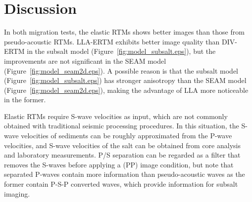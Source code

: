 \documentclass[manuscript,ulem,graphix,revised]{geophysics}
\begin{document}
%

\section{Discussion}
\indent\indent
In both migration tests, the elastic RTMs shows better images than those from pseudo-acoustic RTMs. LLA-ERTM exhibits better image quality than DIV-ERTM in the subsalt model (Figure~\ref{fig:model_subsalt.eps}), but the improvements are not significant in the SEAM model (Figure~\ref{fig:model_seam2d.eps}). A possible reason is that the subsalt model (Figure~\ref{fig:model_subsalt.eps}) has stronger anisotropy than the SEAM model (Figure~\ref{fig:model_seam2d.eps}), making the advantage of LLA more noticeable in the former. 

Elastic RTMs require S-wave velocities as input, which are not commonly obtained with traditional seismic processing procedures. In this situation, the S-wave velocities of sediments can be roughly approximated from the P-wave velocities, and S-wave velocities of the salt can be obtained from core analysis and laboratory measurements. P/S separation can be regarded as a filter that removes the S-waves before applying a (PP) image condition, but note that separated P-waves contain more information than pseudo-acoustic waves as the former contain P-S-P converted waves, which provide information for subsalt imaging.
\end{document}
